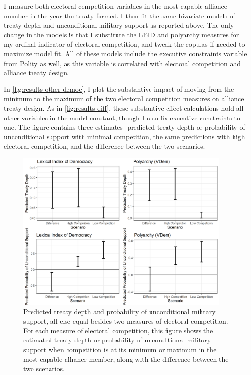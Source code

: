 \documentclass[12pt]{article}
\begin{document}
I measure both electoral competition variables in the most capable alliance member in the year the treaty formed. 
I then fit the same bivariate models of treaty depth and unconditional military support as reported above. 
The only change in the models is that I substitute the LEID and polyarchy measures for my ordinal indicator of electoral competition, and tweak the copulas if needed to maximize model fit.
All of these models include the executive constraints variable from Polity as well, as this variable is correlated with electoral competition and alliance treaty design. 


In \autoref{fig:results-other-democ}, I plot the substantive impact of moving from the minimum to the maximum of the two electoral competition measures on alliance treaty design. 
As in \autoref{fig:results-diff}, these substantive effect calculations hold all other variables in the model constant, though I also fix executive constraints to one.
The figure contains three estimates- predicted treaty depth or probability of unconditional support with minimal competition, the same predictions with high electoral competition, and the difference between the two scenarios. 


\begin{figure}[hbtp]
\centering
\includegraphics[width=0.95\textwidth]{../figures/results-other-democ.png}
\caption{Predicted treaty depth and probability of unconditional military support, all else equal besides two measures of electoral competition. For each measure of electoral competition, this figure shows the estimated treaty depth or probability of unconditional military support when competition is at its minimum or maximum in the most capable alliance member, along with the difference between the two scenarios.}
\label{fig:results-other-democ}
\end{figure}
\end{document}
